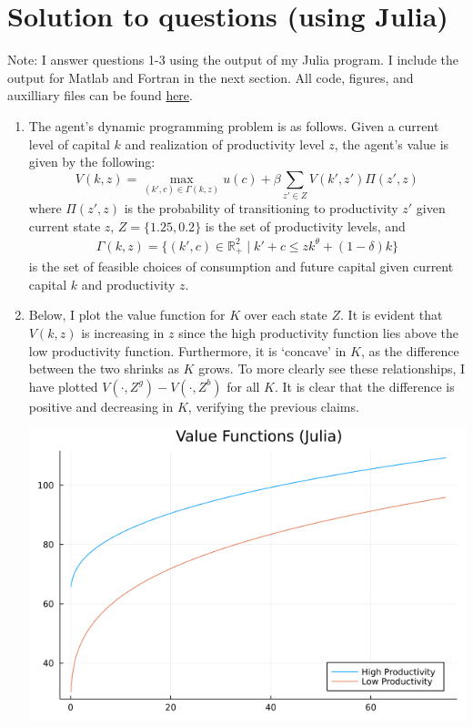 \documentclass[12pt]{article}
\begin{document}
\section{Solution to questions (using Julia)}
Note: I answer questions 1-3 using the output of my Julia program. I include the output for Matlab and Fortran in the next section. All code, figures, and auxilliary files can be found \href{https://github.com/johnfhiggins/F22/tree/master/Computational/PS1}{here}. 
\begin{enumerate}
	\item The agent's dynamic programming problem is as follows. Given a current level of capital $k$ and realization of productivity level $z$, the agent's value is given by the following:
	\[V(k, z) = \max_{(k', c) \in \Gamma(k,z)} u(c) + \beta \sum_{z' \in Z} V(k', z') \Pi(z', z)\]
	where $\Pi(z',z)$ is the probability of transitioning to productivity $z'$ given current state $z$, $Z = \{1.25, 0.2\}$ is the set of productivity levels, and
	\begin{align*}\Gamma(k,z) = \{(k', c) \in \mathbb{R}^2_+ \mid k' + c \leq z k^{\theta} + (1-\delta) k\}
	\end{align*}
	is the set of feasible choices of consumption and future capital given current capital $k$ and productivity $z$.
    \item Below, I plot the value function for $K$ over each state $Z$. It is evident that $V(k, z)$ is increasing in $z$ since the high productivity function lies above the low productivity function. Furthermore, it is `concave' in $K$, as the difference between the two shrinks as $K$ grows. To more clearly see these relationships, I have plotted $V(\cdot, Z^g) - V(\cdot, Z^b)$ for all $K$. It is clear that the difference is positive and decreasing in $K$, verifying the previous claims.
    \begin{center}
        \includegraphics[scale=0.4]{vfplot.png}\\

\end{center}
\end{enumerate}
\end{document}
